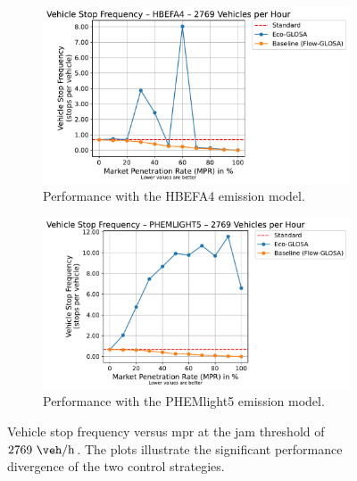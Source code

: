 \begin{figure}[htbp]
  \centering
  \begin{subfigure}[b]{0.98\textwidth}
    \includegraphics[width=\textwidth]{data/img/VehicleStopFrequency/VehicleStopFrequency_HBEFA4_Cars2769.pdf}
    \caption{Performance with the HBEFA4 emission model.}
    \label{fig:StopFreq_2769_HBEFA4}
  \end{subfigure}
  \begin{subfigure}[b]{0.98\textwidth}
    \includegraphics[width=\textwidth]{data/img/VehicleStopFrequency/VehicleStopFrequency_PHEMLIGHT5_Cars2769.pdf}
    \caption{Performance with the PHEMlight5 emission model.}
    \label{fig:StopFreq_2769_PHEM}
  \end{subfigure}
  \caption[Vehicle stop frequency vs. \ac{mpr} at $2769~\unit{\veh\per\hour}$]{Vehicle stop frequency versus \ac{mpr} at the jam threshold of $2769~\unit{\veh\per\hour}$. The plots illustrate the significant performance divergence of the two control strategies.}
  \label{fig:StopFreq_2769}
\end{figure}

